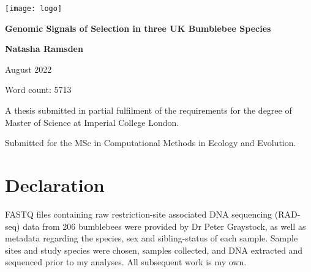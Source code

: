 \documentclass[12pt]{article}
\begin{document}
	\thispagestyle{empty}
	
	\begin{titlepage}
		
		
		\texttt{[image: logo]}
		
	    \vfill
		
		\begin{center}
			
			\huge	
			\textbf{Genomic Signals of Selection in \linebreak three UK Bumblebee Species}
			
			\vspace{0.5cm}
			
			\LARGE
			\textbf{Natasha Ramsden}
			
			\vspace{1cm}
				
			August 2022
			
			\vspace{0.5cm}
			
			\large
			Word count: 5713
			
			\vfill
		
		    \large
		    A thesis submitted in partial fulfilment of the requirements for the \linebreak degree of Master of Science at Imperial College London. 
		    		
		    \vspace{0.5cm}
		    
		    Submitted for the MSc in Computational Methods in Ecology and Evolution.	
	
		\end{center}
	\end{titlepage}

	\normalsize

    \section*{Declaration}
    
    FASTQ files containing raw restriction-site associated DNA sequencing (RAD-seq) data from 206 bumblebees were provided by Dr Peter Graystock, as well as metadata regarding the species, sex and sibling-status of each sample. Sample sites and study species were chosen, samples collected, and DNA extracted and sequenced prior to my analyses. All subsequent work is my own.
\end{document}
